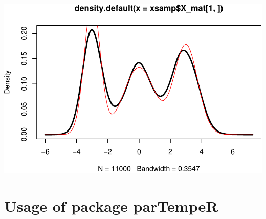\documentclass[]{article}
\begin{document}
\includegraphics{replication_code_files/figure-latex/unnamed-chunk-6-1.pdf}

\hypertarget{usage-of-package-partemper}{%
\section{\texorpdfstring{Usage of package
\textbf{parTempeR}}{Usage of package parTempeR}}\label{usage-of-package-partemper}}
\end{document}
